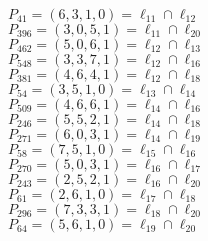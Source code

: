 \documentclass{article}
\begin{document}
{\begin{multicols}{2}
$P_{41} = ( 6, 3, 1, 0 ) = \ell_{11} \cap \ell_{12} $\\
$P_{396} = ( 3, 0, 5, 1 ) = \ell_{11} \cap \ell_{20} $\\
$P_{462} = ( 5, 0, 6, 1 ) = \ell_{12} \cap \ell_{13} $\\
$P_{548} = ( 3, 3, 7, 1 ) = \ell_{12} \cap \ell_{16} $\\
$P_{381} = ( 4, 6, 4, 1 ) = \ell_{12} \cap \ell_{18} $\\
$P_{54} = ( 3, 5, 1, 0 ) = \ell_{13} \cap \ell_{14} $\\
$P_{509} = ( 4, 6, 6, 1 ) = \ell_{14} \cap \ell_{16} $\\
$P_{246} = ( 5, 5, 2, 1 ) = \ell_{14} \cap \ell_{18} $\\
$P_{271} = ( 6, 0, 3, 1 ) = \ell_{14} \cap \ell_{19} $\\
$P_{58} = ( 7, 5, 1, 0 ) = \ell_{15} \cap \ell_{16} $\\
$P_{270} = ( 5, 0, 3, 1 ) = \ell_{16} \cap \ell_{17} $\\
$P_{243} = ( 2, 5, 2, 1 ) = \ell_{16} \cap \ell_{20} $\\
$P_{61} = ( 2, 6, 1, 0 ) = \ell_{17} \cap \ell_{18} $\\
$P_{296} = ( 7, 3, 3, 1 ) = \ell_{18} \cap \ell_{20} $\\
$P_{64} = ( 5, 6, 1, 0 ) = \ell_{19} \cap \ell_{20} $\\
\end{multicols}
}
\end{document}
